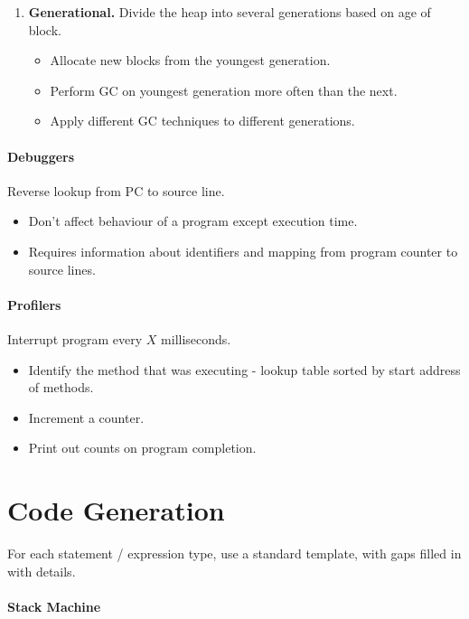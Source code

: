 \documentclass[twocolumn,english]{article}
\begin{document}
\begin{enumerate}
\begin{itemize}
\end{itemize}
\item \textbf{Generational.} Divide the heap into several generations based
on age of block.
\begin{itemize}
\item Allocate new blocks from the youngest generation. 
\item Perform GC on youngest generation more often than the next. 
\item Apply different GC techniques to different generations. 
\end{itemize}
\end{enumerate}

\paragraph{Debuggers}

Reverse lookup from PC to source line. 
\begin{itemize}
\item Don't affect behaviour of a program except execution time. 
\item Requires information about identifiers and mapping from program counter
to source lines. 
\end{itemize}

\paragraph{Profilers}

Interrupt program every $X$ milliseconds. 
\begin{itemize}
\item Identify the method that was executing - lookup table sorted by start
address of methods. 
\item Increment a counter. 
\item Print out counts on program completion. 
\end{itemize}

\section{Code Generation}

For each statement / expression type, use a standard template, with
gaps filled in with details.

\paragraph{Stack Machine}
\end{document}
